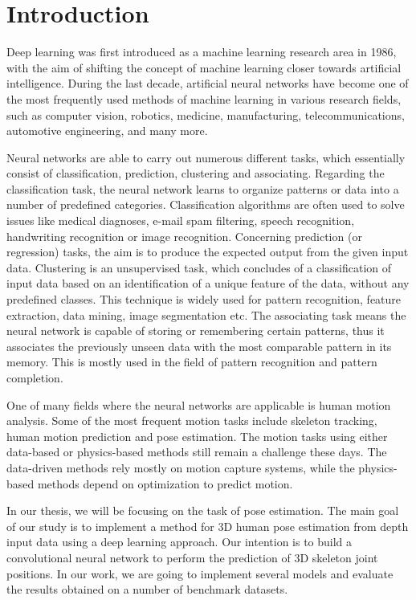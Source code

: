 \chapter{Introduction}\label{chap:intro}

Deep learning was first introduced as a machine learning research area in 1986, with the aim of shifting the concept of machine learning closer towards artificial intelligence. During the last decade, artificial neural networks have become one of the most frequently used methods of machine learning in various research fields, such as computer vision, robotics, medicine, manufacturing, telecommunications, automotive engineering, and many more.\par
\vspace{5mm}
\noindent Neural networks are able to carry out numerous different tasks, which essentially consist of classification, prediction, clustering and associating. Regarding the classification task, the neural network learns to organize patterns or data into a number of predefined categories. Classification algorithms are often used to solve issues like medical diagnoses, e-mail spam filtering, speech recognition, handwriting recognition or image recognition. Concerning prediction (or regression) tasks, the aim is to produce the expected output from the given input data. Clustering is an unsupervised task, which concludes of a classification of input data based on an identification of a unique feature of the data, without any predefined classes. This technique is widely used for pattern recognition, feature extraction, data mining, image segmentation etc. The associating task means the neural network is capable of storing or remembering certain patterns, thus it associates the previously unseen data with the most comparable pattern in its memory. This is mostly used in the field of pattern recognition and pattern completion.\par
\vspace{5mm}
\noindent One of many fields where the neural networks are applicable is human motion analysis. Some of the most frequent motion tasks include skeleton tracking, human motion prediction and pose estimation. The motion tasks using either data-based or physics-based methods still remain a challenge these days. The data-driven methods rely mostly on motion capture systems, while the physics-based methods depend on optimization to predict motion.
\par
\vspace{5mm}
\noindent 
In our thesis, we will be focusing on the task of pose estimation. The main goal of our study is to implement a method for 3D human pose estimation from depth input data using a deep learning approach. Our intention is to build a convolutional neural network to perform the prediction of 3D skeleton joint positions. In our work, we are going to implement several models and evaluate the results obtained on a number of benchmark datasets.\par
